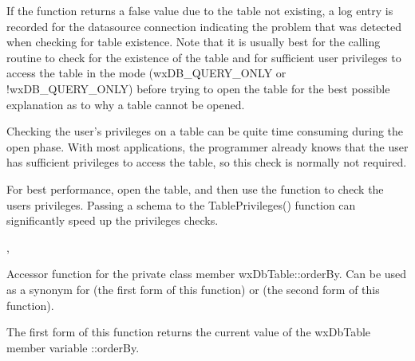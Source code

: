 If the function returns a false value due to the table not existing, a log
entry is recorded for the datasource connection indicating the problem
that was detected when checking for table existence.  Note that it is usually
best for the calling routine to check for the existence of the table and for
sufficient user privileges to access the table in the mode (wxDB\_QUERY\_ONLY or
!wxDB\_QUERY\_ONLY) before trying to open the table for the best possible
explanation as to why a table cannot be opened.

Checking the user's privileges on a table can be quite time consuming during
the open phase.  With most applications, the programmer already knows that the
user has sufficient privileges to access the table, so this check is normally
not required.

For best performance, open the table, and then use the
 function
to check the users privileges.  Passing a schema to the TablePrivileges()
function can significantly speed up the privileges checks.


,

\label{wxdbtableorderby}



Accessor function for the private class member wxDbTable::orderBy.  Can be
used as a synonym for
(the first form of this function) or
(the second form of this function).




The first form of this function returns the current value of the wxDbTable
member variable ::orderBy.

